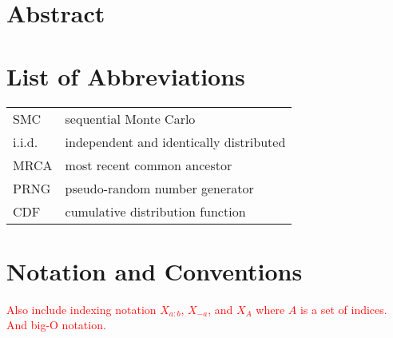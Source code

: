 \documentclass[oneside]{scrbook} %
\newcommand{\seb}[1]{\xspace\textcolor{red}{#1}\xspace} %
\theoremstyle{definition}
\newcommand{\1}[1]{\mathbbm{1}_{#1}} %
\begin{document}
\chapter[Abstract]{Abstract} %



\chapter{List of Abbreviations}
\begin{tabular}{p{} p{}}
SMC & sequential Monte Carlo \\
i.i.d. & independent and identically distributed \\
MRCA & most recent common ancestor \\
PRNG & pseudo-random number generator \\
CDF & cumulative distribution function \\
\end{tabular}


\chapter{Notation and Conventions}
\seb{Also include indexing notation $X_{a:b}$, $X_{-a}$, and $X_A$ where $A$ is a set of indices. And big-O notation.}
\end{document}
